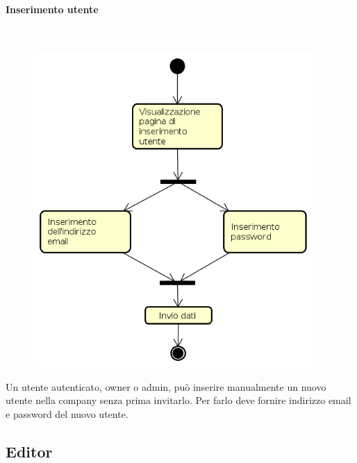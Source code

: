 \paragraph{Inserimento utente} \mbox{} \\
\begin{figure}[H]
\begin{center}
\includegraphics[height=12cm]{res/sections/backend/activities/inserimentoUtente.png}
\end{center}
\end{figure}
Un utente autenticato, owner o admin, può inserire manualmente un nuovo utente nella company senza prima invitarlo. Per farlo deve fornire indirizzo email e password del nuovo utente.
\subsection{Editor}
